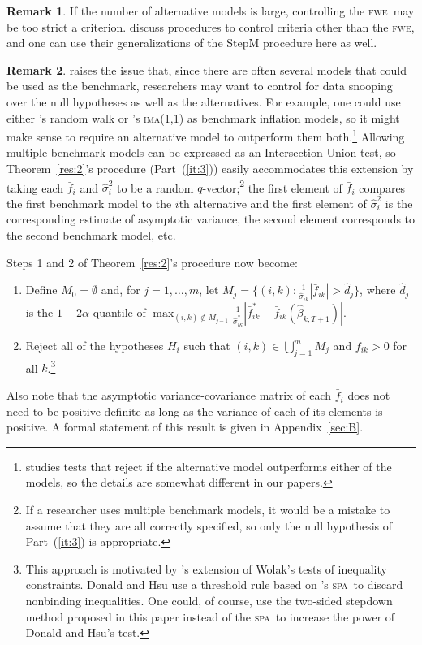 \documentclass[10pt,fleqn,draft]{article}
\newcommand\citepos[2][]{\citeauthor{#2}'s \citeyearpar[#1]{#2}}
\theoremstyle{definition}
\newtheorem{rem}{Remark}
\newcommand{\fwe}{\textsc{fwe}}
\newcommand{\spa}{\textsc{spa}}
\begin{document}
\begin{rem}
  If the number of alternative models is large, controlling the \fwe\
  may be too strict a criterion.  \citet{RSW:08} discuss procedures to
  control criteria other than the \fwe, and one can use their
  generalizations of the StepM procedure here as well.
\end{rem}

\begin{rem}\label{rem:01}
  \citet{Pin:11} raises the issue that, since there are often several
  models that could be used as the benchmark, researchers may want to
  control for data snooping over the null hypotheses as well as the
  alternatives.  For example, one could use either \citepos{AtO:01}
  random walk or \citepos{StW:07} \textsc{ima}(1,1) as benchmark
  inflation models, so it might make sense to require an alternative
  model to outperform them both.\footnote{\citet{Pin:11} studies tests
    that reject if the alternative model outperforms either of the
    models, so the details are somewhat different in our papers.}
  Allowing multiple benchmark models can be expressed as an
  Intersection-Union test, so Theorem~\ref{res:2}'s procedure
  (Part~(\ref{it:3})) easily accommodates this extension by taking
  each $\bar f_i$ and $\hat{\sigma}_{i}^{2}$ to be a random
  $q$-vector;\footnote{If a researcher uses multiple benchmark models,
    it would be a mistake to assume that they are all correctly
    specified, so only the null hypothesis of Part~(\ref{it:3}) is
    appropriate.} the first element of $\bar f_{i}$ compares the first
  benchmark model to the $i$th alternative and the first element of
  $\hat{\sigma}_i^2$ is the corresponding estimate of asymptotic
  variance, the second element corresponds to the second benchmark
  model, etc.

  Steps 1 and 2 of Theorem~\ref{res:2}'s procedure now become:
  \begin{enumerate}
  \item Define $M_0 = \emptyset$ and, for $j = 1,\dots,m$, let $M_j =
    \{(i,k): \tfrac1{\hat\sigma_{ik}} |\bar{f}_{ik}| > \hat{d}_j\}$,
    where $\hat{d}_j$ is the $1-2 \alpha$ quantile of $\max_{(i,k)
      \notin M_{j-1}} \tfrac1{\hat\sigma_{ik}^*} |\bar{f}_{ik}^{*} -
    \bar{f}_{ik}(\hat{\beta}_{k,T+1})|$.
  \item Reject all of the hypotheses $H_i$ such that $(i,k) \in
    \bigcup_{j=1}^m M_j$ and $\bar{f}_{ik} > 0$ for all
    $k$.\footnote{This approach is motivated by \citepos{DoH:11}
      extension of Wolak's \citeyearpar{Wol:89b,Wol:91} tests of
      inequality constraints.  Donald and Hsu use a threshold rule
      based on \citepos{Han:05} \spa\ to discard nonbinding
      inequalities.  One could, of course, use the two-sided stepdown
      method proposed in this paper instead of the \spa\ to increase
      the power of Donald and Hsu's test.}
  \end{enumerate}
  Also note that the asymptotic variance-covariance matrix of each
  $\bar f_i$ does not need to be positive definite as long as the
  variance of each of its elements is positive.  A formal statement of
  this result is given in Appendix~\ref{sec:B}.
\end{rem}
\end{document}
